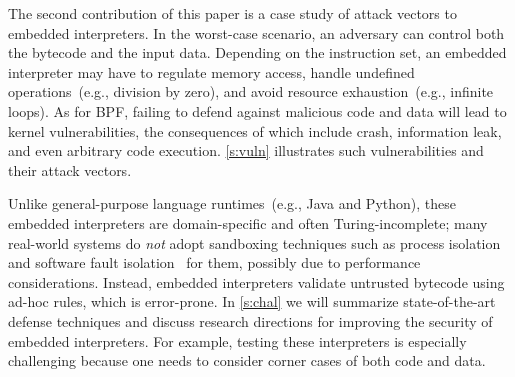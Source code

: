 The second contribution of this paper is a case study of
attack vectors to embedded interpreters.
In the worst-case scenario,
an adversary can control both the bytecode and the input data.
Depending on the instruction set,
an embedded interpreter may have to
regulate memory access,
handle undefined operations~(e.g., division by zero),
and avoid resource exhaustion~(e.g., infinite loops).
As for BPF, failing to defend against malicious code and data will lead
to kernel vulnerabilities, the consequences of which include crash,
information leak, and even arbitrary code execution.
\autoref{s:vuln} illustrates such vulnerabilities
and their attack vectors.

Unlike general-purpose language runtimes~(e.g., Java and Python),
these embedded interpreters are domain-specific and often Turing-incomplete;
many real-world systems do \emph{not} adopt
sandboxing techniques such as process isolation~\cite{reis:chrome}
and software fault isolation~\cite{wahbe:sfi} for them,
possibly due to performance considerations.
Instead, embedded interpreters validate untrusted bytecode using ad-hoc
rules, which is error-prone.
In \autoref{s:chal}
we will summarize state-of-the-art defense techniques
and discuss research directions for improving the security
of embedded interpreters.
For example,
testing these interpreters is especially challenging because
one needs to consider corner cases of both code and data.
